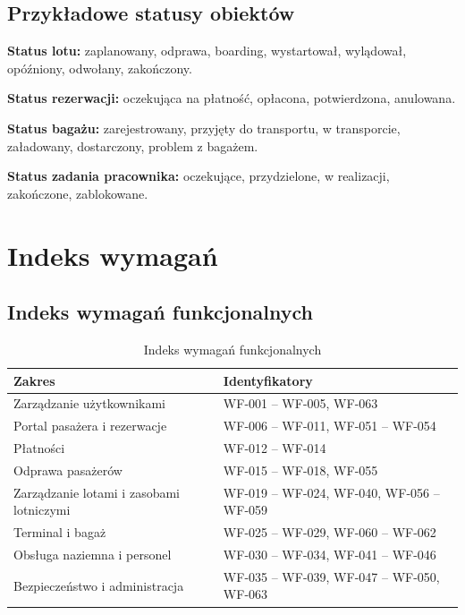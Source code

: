 \documentclass[12pt,a4paper,oneside]{report}
\begin{document}
\section{Przykładowe statusy obiektów}
\textbf{Status lotu:} zaplanowany, odprawa, boarding, wystartował, wylądował, opóźniony, odwołany, zakończony.

\textbf{Status rezerwacji:} oczekująca na płatność, opłacona, potwierdzona, anulowana.

\textbf{Status bagażu:} zarejestrowany, przyjęty do transportu, w transporcie, załadowany, dostarczony, problem z bagażem.

\textbf{Status zadania pracownika:} oczekujące, przydzielone, w realizacji, zakończone, zablokowane.

\chapter{Indeks wymagań}

\section{Indeks wymagań funkcjonalnych}
\begin{longtable}{|p{5cm}|p{8cm}|}
\caption{Indeks wymagań funkcjonalnych}\label{tab:indeks-wf}\\\hline
\rowcolor{lightblue}\textbf{Zakres} & \textbf{Identyfikatory}\\\hline
Zarządzanie użytkownikami & WF-001 -- WF-005, WF-063\\\hline
Portal pasażera i rezerwacje & WF-006 -- WF-011, WF-051 -- WF-054\\\hline
Płatności & WF-012 -- WF-014\\\hline
Odprawa pasażerów & WF-015 -- WF-018, WF-055\\\hline
Zarządzanie lotami i zasobami lotniczymi & WF-019 -- WF-024, WF-040, WF-056 -- WF-059\\\hline
Terminal i bagaż & WF-025 -- WF-029, WF-060 -- WF-062\\\hline
Obsługa naziemna i personel & WF-030 -- WF-034, WF-041 -- WF-046\\\hline
Bezpieczeństwo i administracja & WF-035 -- WF-039, WF-047 -- WF-050, WF-063\\\hline
\end{longtable}
\end{document}
